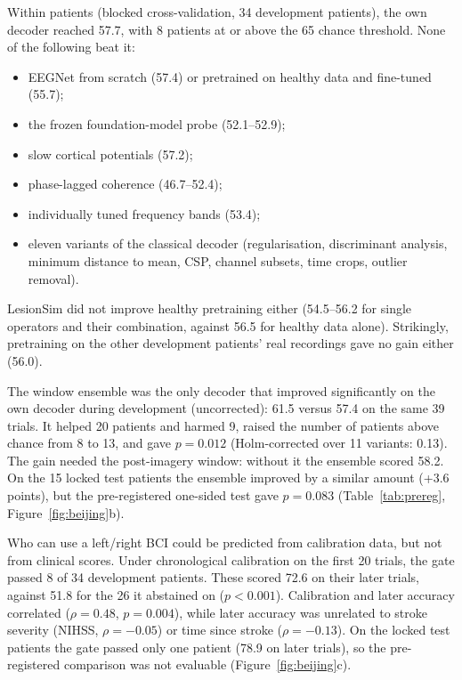 Within patients (blocked cross-validation, 34 development patients), the own decoder reached 57.7\pct{}, with 8 patients at or above the 65\pct{} chance threshold. None of the following beat it:
\begin{itemize}
  \item EEGNet from scratch (57.4\pct{}) or pretrained on healthy data and fine-tuned (55.7\pct{});
  \item the frozen foundation-model probe (52.1--52.9\pct{});
  \item slow cortical potentials (57.2\pct{});
  \item phase-lagged coherence (46.7--52.4\pct{});
  \item individually tuned frequency bands (53.4\pct{});
  \item eleven variants of the classical decoder (regularisation, discriminant analysis, minimum distance to mean, CSP, channel subsets, time crops, outlier removal).
\end{itemize}
LesionSim did not improve healthy pretraining either (54.5--56.2\pct{} for single operators and their combination, against 56.5\pct{} for healthy data alone). Strikingly, pretraining on the other development patients' real recordings gave no gain either (56.0\pct{}).

The window ensemble was the only decoder that improved significantly on the own decoder during development (uncorrected): 61.5\pct{} versus 57.4\pct{} on the same 39 trials. It helped 20 patients and harmed 9, raised the number of patients above chance from 8 to 13, and gave $p = 0.012$ (Holm-corrected over 11 variants: 0.13). The gain needed the post-imagery window: without it the ensemble scored 58.2\pct{}. On the 15 locked test patients the ensemble improved by a similar amount (+3.6 points), but the pre-registered one-sided test gave $p = 0.083$ (Table~\ref{tab:prereg}, Figure~\ref{fig:beijing}b).

Who can use a left/right BCI could be predicted from calibration data, but not from clinical scores. Under chronological calibration on the first 20 trials, the gate passed 8 of 34 development patients. These scored 72.6\pct{} on their later trials, against 51.8\pct{} for the 26 it abstained on ($p < 0.001$). Calibration and later accuracy correlated ($\rho = 0.48$, $p = 0.004$), while later accuracy was unrelated to stroke severity (NIHSS, $\rho = -0.05$) or time since stroke ($\rho = -0.13$). On the locked test patients the gate passed only one patient (78.9\pct{} on later trials), so the pre-registered comparison was not evaluable (Figure~\ref{fig:beijing}c).


